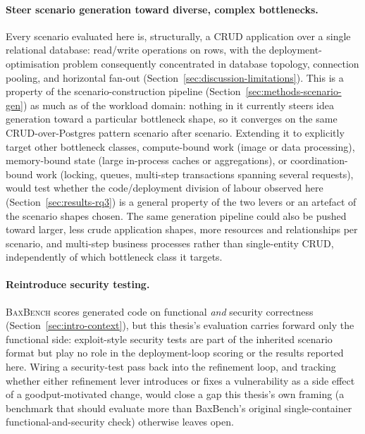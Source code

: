 \paragraph{Steer scenario generation toward diverse, complex bottlenecks.}
Every scenario evaluated here is, structurally, a CRUD application over a
single relational database: read/write operations on rows, with the
deployment-optimisation problem consequently concentrated in database topology,
connection pooling, and horizontal fan-out
(Section~\ref{sec:discussion-limitations}). This is a property of the
scenario-construction pipeline (Section~\ref{sec:methods-scenario-gen})
as much as of the workload domain: nothing in it currently steers idea
generation toward a particular bottleneck shape, so it converges on the
same CRUD-over-Postgres pattern scenario after scenario. Extending it to
explicitly target other bottleneck classes, compute-bound work
(image or data processing), memory-bound state (large in-process caches
or aggregations), or coordination-bound work (locking, queues,
multi-step transactions spanning several requests), would test whether
the code/deployment division of labour observed here
(Section~\ref{sec:results-rq3}) is a general property of the two levers or
an artefact of the scenario shapes chosen. The same generation pipeline
could also be pushed toward larger, less crude application shapes, more
resources and relationships per scenario, and multi-step business
processes rather than single-entity CRUD, independently of which
bottleneck class it targets.

\paragraph{Reintroduce security testing.} \textsc{BaxBench} scores
generated code on functional \emph{and} security correctness
(Section~\ref{sec:intro-context}), but this thesis's evaluation carries
forward only the functional side: exploit-style security tests are part
of the inherited scenario format but play no role in the deployment-loop
scoring or the results reported here. Wiring a security-test pass back
into the refinement loop, and tracking whether either refinement lever
introduces or fixes a vulnerability as a side effect of a goodput-motivated
change, would close a gap this thesis's own framing (a benchmark that
should evaluate more than BaxBench's original single-container
functional-and-security check) otherwise leaves open.

